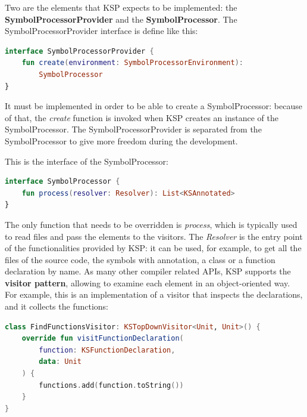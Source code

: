 Two are the elements that KSP expects to be implemented: the \textbf{SymbolProcessorProvider} and the \textbf{SymbolProcessor}.\newline
The SymbolProcessorProvider interface is define like this:
\begin{lstlisting}[caption={SymbolProcessorProvider interface \cite{ksp_documentation}}, language=Kotlin, captionpos=b, label={code:symbol_processor_provider_interface}]
interface SymbolProcessorProvider {
    fun create(environment: SymbolProcessorEnvironment):
        SymbolProcessor
}
\end{lstlisting}
It must be implemented in order to be able to create a SymbolProcessor: because of that, the \textit{create} function is invoked when KSP creates an instance of the SymbolProcessor. The SymbolProcessorProvider is separated from the SymbolProcessor to give more freedom during the development.

This is the interface of the SymbolProcessor:
\begin{lstlisting}[caption={SymbolProcessor interface \cite{ksp_documentation}}, language=Kotlin, captionpos=b, label={code:symbol_processor_interface}]
interface SymbolProcessor {
    fun process(resolver: Resolver): List<KSAnnotated>
}
\end{lstlisting}
The only function that needs to be overridden is \textit{process}, which is typically used to read files and pass the elements to the visitors.\newline
The \textit{Resolver} is the entry point of the functionalities provided by KSP: it can be used, for example, to get all the files of the source code, the symbols with annotation, a class or a function declaration by name.\newline
As many other compiler related APIs, KSP supports the \textbf{visitor pattern}, allowing to examine each element in an object-oriented way.\newline
For example, this is an implementation of a visitor that inspects the declarations, and it collects the functions:
\begin{lstlisting}[caption={Visitor that collects function declarations \cite{ksp_documentation}}, language=Kotlin, captionpos=b, label={code:ksp_visitor}]
class FindFunctionsVisitor: KSTopDownVisitor<Unit, Unit>() {
    override fun visitFunctionDeclaration(
        function: KSFunctionDeclaration,
        data: Unit
    ) {
        functions.add(function.toString())
    }
}
\end{lstlisting}

